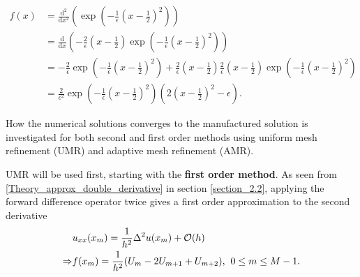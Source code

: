 \begin{equation*}
\begin{split}
    f(x) &= \frac{\mathrm{d}^2}{\mathrm{d}x^2}\left(\exp{\left(-\frac{1}{\epsilon}\left(x-\frac{1}{2}\right)^2\right)}\right)\\ &= \frac{\mathrm{d}}{\mathrm{d}x}\left(-\frac{2}{\epsilon}\left(x-\frac{1}{2}\right)\exp{\left(-\frac{1}{\epsilon}\left(x-\frac{1}{2}\right)^2\right)}\right) \\
    &= -\frac{2}{\epsilon}\exp{\left(-\frac{1}{\epsilon}\left(x-\frac{1}{2}\right)^2\right)} + \frac{2}{\epsilon}\left(x-\frac{1}{2}\right)\frac{2}{\epsilon}\left(x-\frac{1}{2}\right)\exp{\left(-\frac{1}{\epsilon}\left(x-\frac{1}{2}\right)^2\right)} \\
    &= \frac{2}{\epsilon^2}\exp{\left(-\frac{1}{\epsilon}\left(x-\frac{1}{2}\right)^2\right)}\left(2\left(x-\frac{1}{2}\right)^2 -\epsilon \right).
\end{split}
\end{equation*}

How the numerical solutions converges to the manufactured solution is investigated for both second and first order methods using uniform mesh refinement (UMR) and adaptive mesh refinement (AMR).  

UMR will be used first, starting with the \textbf{first order method}. As seen from \eqref{Theory_approx_double_derivative} in section \ref{section_2.2}, applying the forward difference operator twice gives a first order approximation to the second derivative
\begin{equation*}
    \begin{split}
        &u_{xx}(x_m) = \frac{1}{h^2}\Delta^2u(x_m) + \mathcal{O}(h)\\
        \Rightarrow &f(x_m) = \frac{1}{h^2}(U_m-2U_{m+1}+U_{m+2}) \text{,} \hspace{2mm} 0 \leq m \leq M-1.
    \end{split}
\end{equation*}

